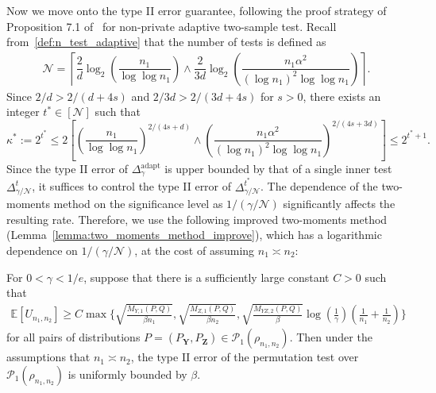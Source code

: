 \documentclass[twoside,11pt]{article}
\newcommand{\test}{\Delta}
\newcommand{\distClassGeneric}{\mathcal{P}}
\newcommand{\rhoTwosample}{\rho_{\sampleSize_1, \sampleSize_2}}
\newcommand{\improvedTwoMomentMethod}{Lemma C.1 of \citet{kim_minimax_2022}}
\newcommand{\rvTwo}{Y}
\newcommand{\rvThree}{Z}
\newcommand{\vectorize}[1]{\mathbf{#1}}
\newcommand{\mE}{\mathbb{E}} %
\newcommand{\adaptiveBinNumIndex}{t}
\newcommand{\dimDensity}{d} %
\newcommand{\sampleSize}{n}
\newcommand{\smoothness}{s}
\newcommand{\kernelMoment}{M} %
\newcommand{\dataGenDist}{P}  %
\newcommand{\privacyMechanism}{Q}
\newcommand{\nTest}{\mathcal{N}} %
\newcommand{\privacyParameter}{\alpha} %
\newcommand{\maxErrorTypeOne}{\gamma} %
\newcommand{\binNum}{\kappa}           %
\newcommand{\momentTwosampleVarCondexpY}{\kernelMoment_{\rvTwo,1}(\dataGenDist, \privacyMechanism)}
\newcommand{\momentTwosampleVarCondexpZ}{\kernelMoment_{\rvThree,1}(\dataGenDist, \privacyMechanism)}
\newcommand{\momentTwosampleExpSquare}{\kernelMoment_{\rvTwo \rvThree,2}(\dataGenDist, \privacyMechanism)}
\newcommand{\adaptiveSingleTest}[1]{\Delta^{#1}}
\newcommand{\pAlterTwosample}{\distClassGeneric_1(\rhoTwosample)}
\begin{document}
\begin{appendix}
	Now we move onto the type II error guarantee, following the proof strategy of Proposition 7.1 of~\citet{kim_minimax_2022} for non-private adaptive two-sample test.
	Recall from~\eqref{def:n_test_adaptive} that the number of tests is defined as
	\begin{align*}
		\mathcal{N}
		=
		\left\lceil
		\dfrac{2}{\dimDensity}
		\log_2{
			\left(
			\dfrac
			{\sampleSize_1}
			{\log \log \sampleSize_1}
			\right)
		}
		\wedge
		\dfrac{2}{3\dimDensity}
		\log_2{
			\left(
			\dfrac
			{\sampleSize_1 \privacyParameter^2}
			{(\log \sampleSize_1)^2\log \log \sampleSize_1}
			\right)
		}	
		\right\rceil.
	\end{align*}
	Since
	$2/\dimDensity > 2/(d+4\smoothness)$
	and
	$2/3\dimDensity > 2/(3d+4\smoothness)$ for $\smoothness>0$, there exists an integer
	$t^\ast \in [\nTest]$
	such that
	\begin{equation}\label{tau_range}
		\binNum^\ast := 
		2^{t^\ast }
		\leq
		2
		\left[
		\left(
		\dfrac
		{\sampleSize_1}
		{\log \log \sampleSize_1}
		\right)^{
			2/(4\smoothness+\dimDensity)
		}
		\wedge
		\left(
		\dfrac
		{ \sampleSize_1 \privacyParameter^2 }
		{ (\log{\sampleSize_1})^2\log \log \sampleSize_1 }
		\right)^{
			2/(4\smoothness+3\dimDensity)
		}
		\right]
		\leq	
		2^{t^\ast+1}.
	\end{equation}
	Since the type II error of $\Delta^{\text{adapt}}_{\maxErrorTypeOne}$ is upper bounded by
	that of a single inner test $\adaptiveSingleTest{\adaptiveBinNumIndex}_{\maxErrorTypeOne/\nTest}$,
	it suffices to  control the type II error of $\test^{t^\ast}_{\maxErrorTypeOne/\nTest}$.
	The dependence of the two-moments method on the significance level as $1/(\maxErrorTypeOne/\nTest)$ significantly affects the resulting rate. Therefore, we use the following improved two-moments method (Lemma~\ref{lemma:two_moments_method_improve}), which has a logarithmic dependence on $1/(\maxErrorTypeOne/\nTest)$, at the cost of assuming $\sampleSize_1 \asymp \sampleSize_2$:
	\begin{lemma}[\improvedTwoMomentMethod]\label{lemma:two_moments_method_improve}
		For $0 < \gamma < 1/e$, suppose that there is a sufficiently large constant $C>0$ such that	
		\begin{align*}
			\mE[U_{\sampleSize_1,\sampleSize_2}]
			\geq
			C
			\max\bigg\{
			\sqrt{
				\frac
				{\momentTwosampleVarCondexpY}
				{\beta \sampleSize_1}
			}
			, 
			\sqrt{
				\frac
				{\momentTwosampleVarCondexpZ}
				{\beta \sampleSize_2}
			}
			, 
			\sqrt{
				\frac
				{\momentTwosampleExpSquare}
				{\beta}
			}
			\log\left(\frac{1}{\gamma}\right)
			\left( \frac{1}{\sampleSize_1} + \frac{1}{\sampleSize_2} \right)
			\bigg\}
		\end{align*}
		for all pairs of distributions $P = (P_{\vectorize{Y}}, P_{\vectorize{Z}}) \in  \pAlterTwosample$.
		Then under the assumptions that $\sampleSize_1 \asymp \sampleSize_2$, the type II error of the permutation test over $\pAlterTwosample$ is uniformly bounded by $\beta$.
	\end{lemma}
	

\end{appendix}
\end{document}
